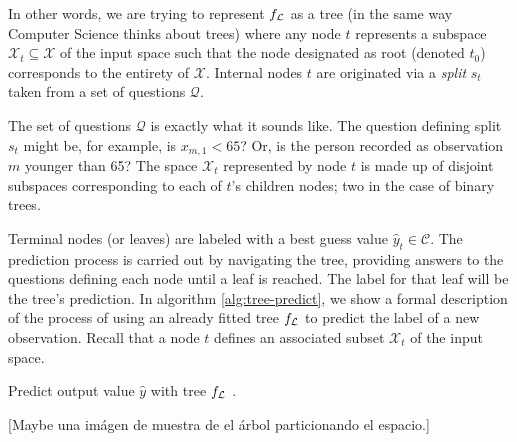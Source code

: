 In other words, we are trying to represent $f_{\mathcal{L}}$ as a tree (in the same way
Computer Science thinks about trees) where any node $t$ represents a subspace
$\mathcal{X}_t \subseteq \mathcal{X}$ of the input space such that the node
designated as root (denoted $t_0$) corresponds to the entirety of $\mathcal{X}$.
Internal nodes $t$ are originated via a \textit{split} $s_t$ taken from a set of
questions $\mathcal{Q}$.

The set of questions $\mathcal{Q}$ is exactly what it sounds like. The question
defining split $s_t$ might be, for example, is $x_{m, 1} < 65$? Or, is the person
recorded as observation $m$ younger than 65? The space $\mathcal{X}_t$
represented by node $t$ is made up of disjoint subspaces corresponding to each
of $t$'s children nodes; two in the case of binary trees. 

Terminal nodes (or leaves) are labeled with a best guess value $\widehat{y}_t
\in \mathcal{C}$. The prediction process is carried out by navigating the tree,
providing answers to the questions defining each node until a leaf is reached.
The label for that leaf will be the tree's prediction. In algorithm
\ref{alg:tree-predict}, we show a formal description of the process of using an
already fitted tree $f_{\mathcal{L}}$ to predict the label of a new observation. Recall
that a node $t$ defines an associated subset $\mathcal{X}_t$ of the input space.

\begin{algorithm}
    \caption[Tree prediction algorithm]{Predict output value $\widehat{y}$ with
        tree $f_{\mathcal{L}}$ \cite[Ch.~3.2]{louppe2014}.}
    \label{alg:tree-predict}
\end{algorithm}

[Maybe una imágen de muestra de el árbol particionando el espacio.]

